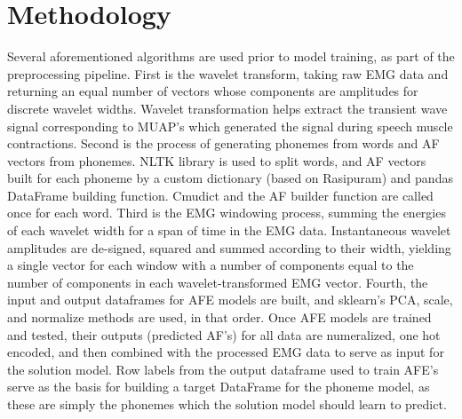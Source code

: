 \documentclass[conference]{IEEEtran}
\begin{document}
\section{Methodology}
Several aforementioned algorithms are used prior to model training, as part of the preprocessing pipeline. First is the wavelet transform, taking raw EMG data and returning an equal number of vectors whose components are amplitudes for discrete wavelet widths. Wavelet transformation helps extract the transient wave signal corresponding to MUAP's which generated the signal during speech muscle contractions. Second is the process of generating phonemes from words and AF vectors from phonemes. NLTK library is used to split words, and AF vectors built for each phoneme by a custom dictionary (based on Rasipuram) and pandas DataFrame building function. Cmudict and the AF builder function are called once for each word. Third is the EMG windowing process, summing the energies of each wavelet width for a span of time in the EMG data. Instantaneous wavelet amplitudes are de-signed, squared and summed according to their width, yielding a single vector for each window with a number of components equal to the number of components in each wavelet-transformed EMG vector. Fourth, the input and output dataframes for AFE models are built, and sklearn's PCA, scale, and normalize methods are used, in that order. Once AFE models are trained and tested, their outputs (predicted AF's) for all data are numeralized, one hot encoded, and then combined with the processed EMG data to serve as input for the solution model. Row labels from the output dataframe used to train AFE's serve as the basis for building a target DataFrame for the phoneme model, as these are simply the phonemes which the solution model should learn to predict.
\end{document}
